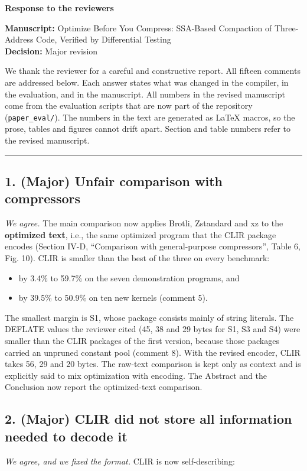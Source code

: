 \documentclass[11pt,a4paper]{article}
\begin{document}
\begin{center}{\Large\bfseries Response to the reviewers}\end{center}
\textbf{Manuscript:} Optimize Before You Compress: SSA-Based Compaction of Three-Address Code, Verified by Differential Testing \\ \textbf{Decision:} Major revision

We thank the reviewer for a careful and constructive report. All fifteen comments are addressed below. Each answer states what was changed in the compiler, in the evaluation, and in the manuscript. All numbers in the revised manuscript come from the evaluation scripts that are now part of the repository (\texttt{paper\_eval/}). The numbers in the text are generated as LaTeX macros, so the prose, tables and figures cannot drift apart. Section and table numbers refer to the revised manuscript.

\medskip\hrule\medskip
\subsection*{1. (Major) Unfair comparison with compressors}
\emph{We agree.} The main comparison now applies Brotli, Zstandard and xz to the \textbf{optimized text}, i.e., the same optimized program that the CLIR package encodes (Section IV-D, ``Comparison with general-purpose compressors'', Table 6, Fig. 10). CLIR is smaller than the best of the three on every benchmark:

\begin{itemize}
\item by 3.4\% to 59.7\% on the seven demonstration programs, and
\item by 39.5\% to 50.9\% on ten new kernels (comment 5).
\end{itemize}
The smallest margin is S1, whose package consists mainly of string literals. The DEFLATE values the reviewer cited (45, 38 and 29 bytes for S1, S3 and S4) were smaller than the CLIR packages of the first version, because those packages carried an unpruned constant pool (comment 8). With the revised encoder, CLIR takes 56, 29 and 20 bytes. The raw-text comparison is kept only as context and is explicitly said to mix optimization with encoding. The Abstract and the Conclusion now report the optimized-text comparison.

\subsection*{2. (Major) CLIR did not store all information needed to decode it}
\emph{We agree, and we fixed the format.} CLIR is now self-describing:
\end{document}

